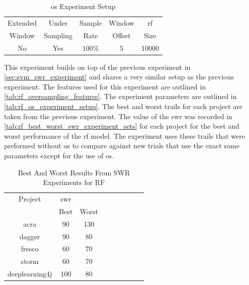 \begin{table}[h]
\begin{center}

    \begin{tabular}{|c|c|c|c|c|}
        \hline
        Extended & Under & Sample & Window & \gls{rf} \\
        Window & Sampling & Rate & Offset & Size \\ \hline
        No & Yes & $100\%$ & 5 & 10000 \\ \hline
    \end{tabular}
    \caption{\gls{os} Experiment Setup}
    \label{tab:rf_os_experiment_setup}
\end{center}

\end{table}


This experiment builds on top of the previous experiment in \autoref{sec:svm_swr_experiment} and shares a very similar setup as the previous experiment. The features used for this experiment are outlined in \autoref{tab:rf_oversampling_features}. The experiment parameters are outlined in \autoref{tab:rf_os_experiment_setup}. The best and worst trails for each project are taken from the previous experiment. The value of the \gls{swr} was recorded in \autoref{tab:rf_best_worst_swr_experiment_sets} for each project for the best and worst performance of the \gls{rf} model. The experiment uses these trails that were preformed without \gls{os} to compare against new trials that use the exact same parameters except for the use of \gls{os}.

\begin{table}[ht]
\begin{center}

    \begin{tabular}{|c|c|c|c|c|c|c|c|c|}
        \hline
        Project & \multicolumn{1}{c}{\gls{swr}} & \\
         & \multicolumn{1}{c}{Best} & \multicolumn{1}{c|}{Worst} \\
         \hline
        acra & 90 & 130 \\
        dagger & 90 & 80 \\
        fresco & 60 & 70 \\
        storm & 60 & 70 \\
        deeplearning4j & 100 & 80 \\ \hline
    \end{tabular}
    \caption{Best And Worst Results From SWR Experiments for RF}
    \label{tab:rf_best_worst_swr_experiment_sets}
\end{center}
\end{table}


